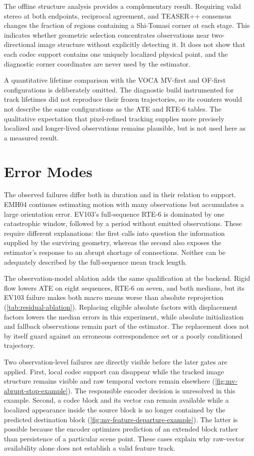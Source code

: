 The offline structure analysis provides a complementary result. Requiring valid
stereo at both endpoints, reciprocal agreement, and TEASER++ consensus changes
the fraction of regions containing a Shi-Tomasi corner at each stage. This
indicates whether geometric selection concentrates observations near
two-directional image structure without explicitly detecting it. It does not
show that each codec support contains one uniquely localized physical point,
and the diagnostic corner coordinates are never used by the estimator.

A quantitative lifetime comparison with the VOCA MV-first and OF-first
configurations is deliberately omitted. The diagnostic build instrumented for
track lifetimes did not reproduce their frozen trajectories, so its counters
would not describe the same configurations as the ATE and RTE-6 tables. The
qualitative expectation that pixel-refined tracking supplies
more precisely localized and longer-lived observations remains plausible, but
is not used here as a measured result.

\section{Error Modes}

The observed failures differ both in duration and in their relation to support.
EMH04 continues estimating motion with many observations but accumulates a large
orientation error. EV103's full-sequence RTE-6 is dominated by one catastrophic
window, followed by a period without emitted observations. These require
different explanations: the first calls into question the information supplied
by the surviving geometry, whereas the second also exposes the estimator's
response to an abrupt shortage of connections. Neither can be adequately
described by the full-sequence mean track length.

The observation-model ablation adds the same qualification at the backend.
Rigid flow lowers ATE on eight sequences, RTE-6 on seven, and both medians, but
its EV103 failure makes both macro means worse than absolute reprojection
(\autoref{tab:residual-ablation}). Replacing eligible absolute factors with
displacement factors lowers the median errors in this experiment, while
absolute initialization and fallback observations remain part of the estimator.
The replacement does not by itself guard against an erroneous correspondence
set or a poorly conditioned trajectory.

Two observation-level failures are directly visible before the later gates are
applied. First, local codec support can disappear while the tracked image
structure remains visible and raw temporal vectors remain elsewhere
(\autoref{fig:mv-abrupt-stop-example}). The responsible encoder decision is
unresolved in this example. Second, a codec block and its vector can
remain available while a localized appearance inside the source block is no
longer contained by the predicted destination block
(\autoref{fig:mv-feature-departure-example}). The latter is possible because the
encoder optimizes prediction of an extended block rather than persistence of a
particular scene point. These cases explain why raw-vector availability alone
does not establish a valid feature track.

